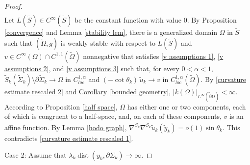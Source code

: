 \documentclass[11pt]{amsart}
\begin{document}
\begin{proof}
\begin{equation*}
\begin{aligned}
		\end{aligned}
	\end{equation*}
Let $L(\tilde S)\in C^\infty(\tilde S)$ be the constant function with value $0$. By Proposition \ref{convergence}  and Lemma \ref{stability lem}, there is a  generalized domain $\Omega$ in $\tilde S$ such that $(\tilde \Omega,g)$ is weakly stable with respect to $L(\tilde S)$ and $v\in C^\infty(\Omega)\cap C^{1,1}(\tilde \Omega)$ nonnegative that satisfies \eqref{v assumptions 1}, \eqref{v assumptions 2}, and \eqref{v assumptions 3} such that, for every $0<\alpha<1$,  $\tilde S_k(\tilde\Sigma_k)\setminus \partial \tilde \Sigma_k\to \Omega $ in $C_{loc}^{1,\alpha}$  and $(-\cot\theta_k)\,\tilde u_k\to v$  in $C^{1,\alpha}_{loc}(\tilde \Omega)$. By \eqref{curvature estimate rescaled 2} and Corollary \ref{bounded geometry}, $|k(\Omega)|_{L^\infty(\tilde \partial \Omega)}<\infty$.  According to Proposition \ref{half space}, $\Omega$ has either one or two components, each of which is congruent to a half-space, and, on each of these components, $v$ is an affine function. By Lemma  \ref{hodo graph}, 	$
\nabla^{\tilde S_k}\nabla^{\tilde S_k}\tilde u_k(\tilde y_k)=o(1)\sin\theta_k.
$ 
	This contradicts \eqref{curvature estimate rescaled 1}. 
	
		
	Case 2: Assume that $\lambda_k\operatorname{dist}(y_k,\partial \Sigma_k)\to\infty$. 
	

\end{proof}
\end{document}
